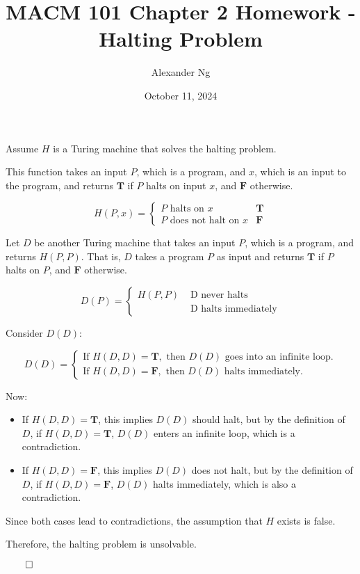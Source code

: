 \documentclass[12pt]{article}
\begin{document}
\title{MACM 101 Chapter 2 Homework - Halting Problem}
\author{Alexander Ng}
\date{October 11, 2024}

\maketitle

Assume $H$ is a Turing machine that solves the halting problem.

This function takes an input $P$, which is a program, and $x$, which is an
input to the program, and returns $\mathbf{T}$ if $P$ halts on input $x$, and 
$\mathbf{F}$ otherwise.

\begin{equation*}
  H(P, x) = \begin{cases}
    P \text{ halts on } x & \mathbf{T} \\
    P \text{ does not halt on } x & \mathbf{F}
  \end{cases}
\end{equation*}

Let $D$ be another Turing machine that takes an input $P$, which is a program,
and returns $H(P, P)$. That is, $D$ takes a program $P$ as input and returns
$\mathbf{T}$ if $P$ halts on $P$, and $\mathbf{F}$ otherwise.

\begin{equation*}
  D(P) = \begin{cases}
    H(P, P) & \text{ D never halts} \\
    & \text{ D halts immediately}
  \end{cases}
\end{equation*}

Consider $D(D)$:

\begin{equation*}
  D(D) = \begin{cases}
    \text{If } H(D, D) = \mathbf{T}, \text{ then } D(D) \text{ goes into an infinite loop.} \\
    \text{If } H(D, D) = \mathbf{F}, \text{ then } D(D) \text{ halts immediately.}
  \end{cases}
\end{equation*}

Now:

\begin{itemize}
  \item If $H(D, D) = \mathbf{T}$, this implies $D(D)$ should halt, but by the definition of $D$, if $H(D, D) = \mathbf{T}$, $D(D)$ enters an infinite loop, which is a contradiction.
  \item If $H(D, D) = \mathbf{F}$, this implies $D(D)$ does not halt, but by the definition of $D$, if $H(D, D) = \mathbf{F}$, $D(D)$ halts immediately, which is also a contradiction.
\end{itemize}

Since both cases lead to contradictions, the assumption that $H$ exists is false.

Therefore, the halting problem is unsolvable.

$\qed$
\end{document}
